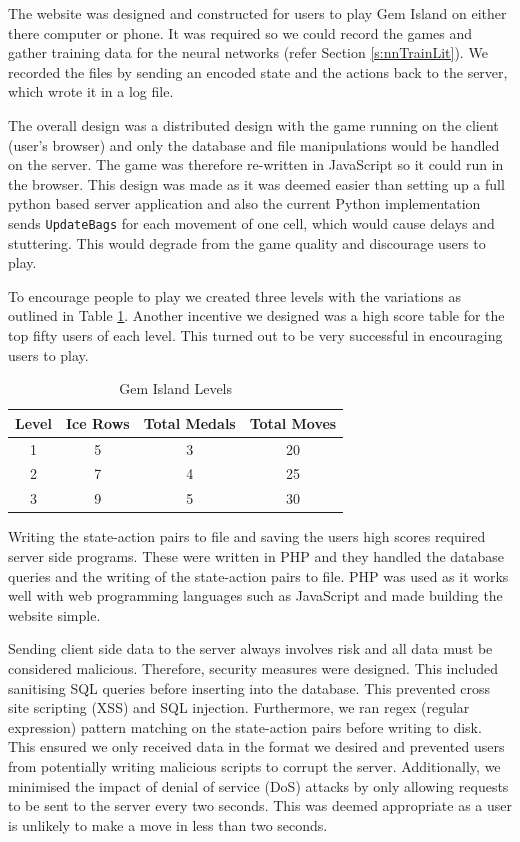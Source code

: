 \documentclass{bhamthesis}
\theoremstyle{definition}
\begin{document}
The website was designed and constructed for users to play Gem Island on either there computer or phone. It was required so we could record the games and gather training data for the neural networks (refer Section \ref{s:nnTrainLit}). We recorded the files by sending an encoded state and the actions back to the server, which wrote it in a log file.

The overall design was a distributed design with the game running on the client (user's browser) and only the database and file manipulations would be handled on the server. The game was therefore re-written in JavaScript so it could run in the browser. This design was made as it was deemed easier than setting up a full python based server application and also the current Python implementation sends \verb|UpdateBags| for each movement of one cell, which would cause delays and stuttering. This would degrade from the game quality and discourage users to play.

To encourage people to play we created three levels with the variations as outlined in Table \ref{t:gameLevels}. Another incentive we designed was a high score table for the top fifty users of each level. This turned out to be very successful in encouraging users to play.

\begin{table}[]
	\centering
	\caption{Gem Island Levels}
	\label{t:gameLevels}
	\begin{tabular}{cccc}
		\hline
		Level & Ice Rows & Total Medals & Total Moves \\ \hline
		1     & 5        & 3            & 20          \\
		2     & 7        & 4            & 25          \\
		3     & 9        & 5            & 30         
	\end{tabular}
\end{table}



Writing the state-action pairs to file and saving the users high scores required server side programs. These were written in PHP and they handled the database queries and the writing of the state-action pairs to file. PHP was used as it works well with web programming languages such as JavaScript and made building the website simple.

Sending client side data to the server always involves risk and all data must be considered malicious. Therefore, security measures were designed. This included sanitising SQL queries before inserting into the database. This prevented cross site scripting (XSS) and SQL injection. Furthermore, we ran regex (regular expression) pattern matching on the state-action pairs before writing to disk. This ensured we only received data in the format we desired and prevented users from potentially writing malicious scripts to corrupt the server. Additionally, we minimised the impact of denial of service (DoS) attacks by only allowing requests to be sent to the server every two seconds. This was deemed appropriate as a user is unlikely to make a move in less than two seconds.
\end{document}
